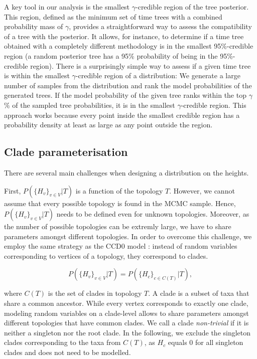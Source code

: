 \documentclass[10pt,letterpaper]{article}
\newcommand{\Pro}[1]{P\left(#1\right)}
\begin{document}
A key tool in our analysis is the smallest $\gamma$-credible region of the tree posterior. This region, defined as the minimum set of time trees with a combined probability mass of $\gamma$, provides a straightforward way to assess the compatibility of a tree with the posterior. It allows, for instance, to determine if a time tree obtained with a completely different methodology is in the smallest 95\%-credible region (a random posterior tree has a 95\% probability of being in the 95\%-credible region). There is a surprisingly simple way to assess if a given time tree is within the smallest $\gamma$-credible region of a distribution: We generate a large number of samples from the distribution and rank the model probabilities of the generated trees. If the model probability of the given tree ranks within the top $\gamma$\% of the sampled tree probabilities, it is in the smallest $\gamma$-credible region. This approach works because every point inside the smallest credible region has a probability density at least as large as any point outside the region.

\subsection*{Clade parameterisation}

There are several main challenges when designing a distribution on the heights.

First, $P\left(\{H_v\}_{v \in V} | T\right)$ is a function of the topology $T$. However, we cannot assume that every possible topology is found in the MCMC sample. Hence, $P\left(\{H_v\}_{v \in V} | T\right)$ needs to be defined even for unknown topologies. Moreover, as the number of possible topologies can be extremly large, we have to share parameters amongst different topologies. In order to overcome this challenge, we employ the same strategy as the CCD0 model \cite{ccd}: instead of random variables corresponding to vertices of a topology, they correspond to clades.

$$
\Pro{\{H_v\}_{v \in V} | T} = \Pro{\{H_c\}_{c \in C(T)} | T},
$$

where $C(T)$ is the set of clades in topology $T$. A clade is a subset of taxa that share a common ancestor. While every vertex corresponds to exactly one clade, modeling random variables on a clade-level allows to share parameters amongst different topologies that have common clades. We call a clade \emph{non-trivial} if it is neither a singleton nor the root clade. In the following, we exclude the singleton clades corresponding to the taxa from $C(T)$, as $H_c$ equals $0$ for all singleton clades and does not need to be modelled. 
\end{document}
